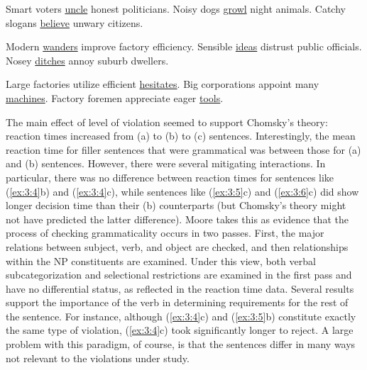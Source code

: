 \ea\label{ex:3:4}
\ea Smart voters \uline{uncle} honest politicians.
\ex Noisy dogs \uline{growl} night animals.
\ex Catchy slogans \uline{believe} unwary citizens.
\z
\z


\ea\label{ex:3:5}
\ea Modern \uline{wanders} improve factory efficiency.
\ex Sensible \uline{ideas} distrust public officials.
\ex Nosey \uline{ditches} annoy suburb dwellers.
\z
\z


\ea\label{ex:3:6}
\ea Large factories utilize efficient \uline{hesitates}. 
\ex Big corporations appoint many \uline{machines}.
\ex Factory foremen appreciate eager \uline{tools}. \citep[553]{Moore1972}
\z
\z


\noindent
The main effect of level of violation seemed to support Chomsky's theory: reaction times increased from (a) to (b) to (c) sentences. Interestingly, the mean reaction time for filler sentences that were grammatical was between those for (a) and
(b) sentences. However, there were several mitigating interactions. In particular, there was no difference between reaction times for sentences like (\ref{ex:3:4}b) and (\ref{ex:3:4}c), while sentences like (\ref{ex:3:5}c) and (\ref{ex:3:6}c) did show longer decision time than their
(b) counterparts (but Chomsky's theory might not have predicted the latter difference). Moore takes this as evidence that the process of checking grammaticality occurs in two passes. First, the major relations between subject, verb, and object are checked, and then relationships within the NP constituents are examined. Under this view, both verbal subcategorization and selectional restrictions are examined in the first pass and have no differential status, as reflected in the reaction time data. Several results support the importance of the verb in determining requirements for the rest of the sentence. For instance, although (\ref{ex:3:4}c) and (\ref{ex:3:5}b) constitute exactly the same type of violation, (\ref{ex:3:4}c) took significantly longer to reject. A large problem with this paradigm, of course, is that the sentences differ in many ways not relevant to the violations under study.


